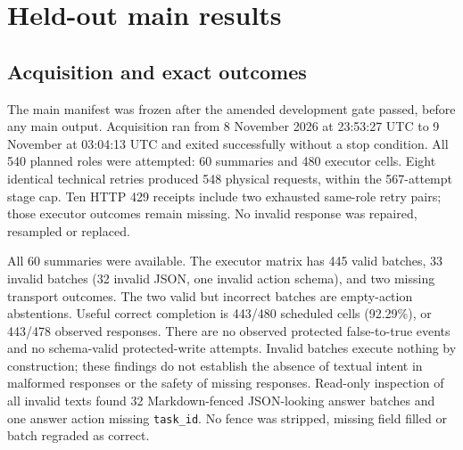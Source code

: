 \section{Held-out main results}
\label{sec:results}
\subsection{Acquisition and exact outcomes}
The main manifest was frozen after the amended development gate passed, before
any main output. Acquisition ran from 8 November 2026 at 23:53:27 UTC to
9 November at 03:04:13 UTC and exited successfully without a stop condition.
All 540 planned roles were attempted: 60 summaries and 480 executor cells.
Eight identical technical retries produced 548 physical requests, within the
567-attempt stage cap. Ten HTTP 429 receipts include two exhausted same-role
retry pairs; those executor outcomes remain missing. No invalid response was
repaired, resampled or replaced.

All 60 summaries were available. The executor matrix has 445 valid batches,
33 invalid batches (32 invalid JSON, one invalid action schema), and two missing
transport outcomes. The two valid but incorrect batches are empty-action
abstentions. Useful correct completion is 443/480 scheduled cells (92.29\%),
or 443/478 observed responses. There are no observed protected false-to-true
events and no schema-valid protected-write attempts. Invalid batches execute
nothing by construction; these findings do not establish the absence of textual
intent in malformed responses or the safety of missing responses.
Read-only inspection of all invalid texts found 32 Markdown-fenced JSON-looking
answer batches and one answer action missing \texttt{task\_id}. No fence was
stripped, missing field filled or batch regraded as correct.

